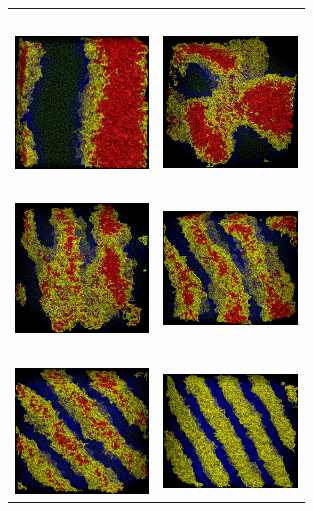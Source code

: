 \documentclass[
journal=mamobx,
manuscript=article,
]{achemso}
\begin{document}
\begin{figure}
	\centering
	\begin{tabular}{C{1.6in}@{}C{1.6in}}
		 \textcolor{white}{$w_{AB}=0.25$} & \textcolor{white}{$w_{AB}=0.40$} \\
		 \includegraphics[width=1.4in]{A5B5_025} & \includegraphics[width=1.4in]{A5B5_040} \\
		 \textcolor{white}{$w_{AB}=0.60$} & \textcolor{white}{$w_{AB}=0.65$} \\
		 \includegraphics[width=1.4in]{A5B5_060} & \includegraphics[width=1.4in]{A5B5_065} \\		
		 \textcolor{white}{$w_{AB}=0.75$} & \textcolor{white}{$w_{AB}=1.00$} \\
		 \includegraphics[width=1.4in]{A5B5_075} & \includegraphics[width=1.4in]{A5B5_100} \\		

\end{tabular}
\end{figure}
\end{document}
